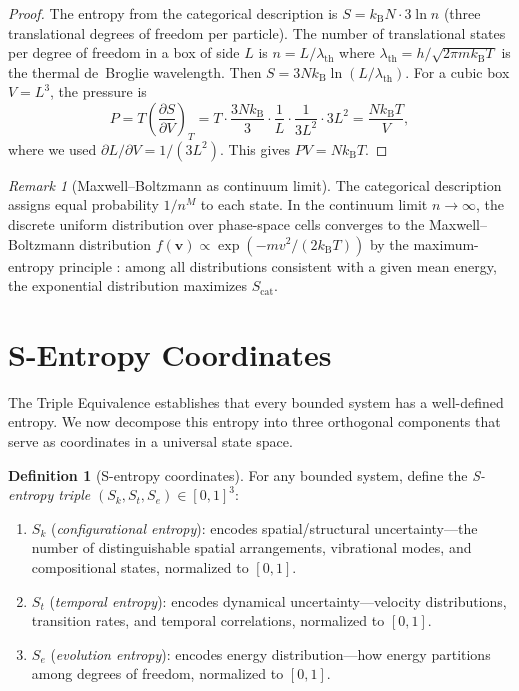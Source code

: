 \documentclass[10pt,twocolumn]{article}
\theoremstyle{definition}
\newtheorem{definition}[theorem]{Definition}
\theoremstyle{remark}
\newtheorem{remark}[theorem]{Remark}
\newcommand{\kB}{k_{\mathrm{B}}}
\newcommand{\Sk}{S_k}
\newcommand{\St}{S_t}
\newcommand{\Se}{S_e}
\begin{document}
\begin{proof}
The entropy from the categorical description is
$S=\kB N\cdot 3\ln n$ (three translational degrees of freedom
per particle).  The number of translational states per degree
of freedom in a box of side $L$ is
$n=L/\lambda_{\mathrm{th}}$ where
$\lambda_{\mathrm{th}}=h/\sqrt{2\pi m\kB T}$ is the thermal
de~Broglie wavelength.  Then $S = 3N\kB\ln(L/\lambda_{\mathrm{th}})$.  For a
cubic box $V=L^3$, the pressure is
\begin{equation}
  P = T\left(\frac{\partial S}{\partial V}\right)_T
  = T\cdot\frac{3N\kB}{3}\cdot\frac{1}{L}\cdot\frac{1}{3L^2}
  \cdot 3L^2 = \frac{N\kB T}{V},
\end{equation}
where we used $\partial L/\partial V = 1/(3L^2)$.  This gives
$PV = N\kB T$.
\end{proof}

\begin{remark}[Maxwell--Boltzmann as continuum limit]
The categorical description assigns equal probability $1/n^M$
to each state.  In the continuum limit $n\to\infty$, the
discrete uniform distribution over phase-space cells converges
to the Maxwell--Boltzmann distribution $f(\mathbf{v})\propto
\exp(-mv^2/(2\kB T))$ by the maximum-entropy principle
\citep{Jaynes1957}: among all distributions consistent with a
given mean energy, the exponential distribution maximizes
$S_{\mathrm{cat}}$.
\end{remark}

\section{S-Entropy Coordinates}\label{sec:sentropy}

The Triple Equivalence establishes that every bounded system
has a well-defined entropy.  We now decompose this entropy
into three orthogonal components that serve as coordinates in a
universal state space.

\begin{definition}[S-entropy coordinates]\label{def:sentropy}
For any bounded system, define the \emph{S-entropy triple}
$(\Sk,\St,\Se)\in[0,1]^3$:
\begin{enumerate}[leftmargin=*,itemsep=2pt]
\item $\Sk$ (\emph{configurational entropy}): encodes
  spatial/structural uncertainty---the number of
  distinguishable spatial arrangements, vibrational modes, and
  compositional states, normalized to $[0,1]$.
\item $\St$ (\emph{temporal entropy}): encodes dynamical
  uncertainty---velocity distributions, transition rates,
  and temporal correlations, normalized to $[0,1]$.
\item $\Se$ (\emph{evolution entropy}): encodes energy
  distribution---how energy partitions among degrees of
  freedom, normalized to $[0,1]$.
\end{enumerate}
\end{definition}
\end{document}

